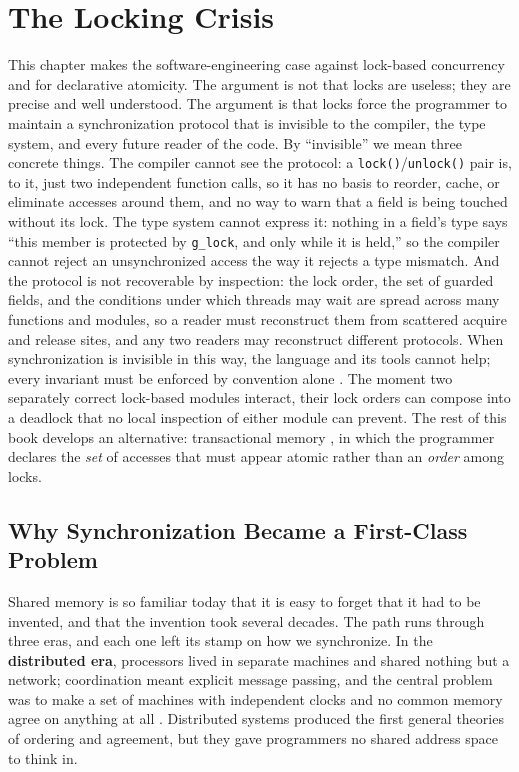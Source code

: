 \chapter{The Locking Crisis}\label{ch:locking-crisis}

This chapter makes the software-engineering case against lock-based concurrency
and for declarative atomicity. The argument is not that locks are useless;
they are precise and well understood. The argument is that locks force the
programmer to maintain a synchronization protocol that is invisible to the
compiler, the type system, and every future reader of the code. By
``invisible'' we mean three concrete things. The compiler cannot see the
protocol: a \texttt{lock()}/\texttt{unlock()} pair is, to it, just two
independent function calls, so it has no basis to reorder, cache, or eliminate
accesses around them, and no way to warn that a field is being touched without
its lock. The type system cannot express it: nothing in a field's type says
``this member is protected by \texttt{g\_lock}, and only while it is held,''
so the compiler cannot reject an unsynchronized access the way it rejects a
type mismatch. And the protocol is not recoverable by inspection: the lock
order, the set of guarded fields, and the conditions under which threads may
wait are spread across many functions and modules, so a reader must reconstruct
them from scattered acquire and release sites, and any two readers may
reconstruct different protocols. When synchronization is invisible in this
way, the language and its tools cannot help; every invariant must be enforced
by convention alone \cite{boehm05}. The moment two separately correct lock-based
modules interact, their lock orders can compose into a deadlock that no local
inspection of either module can prevent. The rest of this book develops an
alternative: transactional memory \cite{herlihy93}, in which the programmer
declares the \emph{set} of accesses that must appear atomic rather than an
\emph{order} among locks.

\section{Why Synchronization Became a First-Class Problem}

Shared memory is so familiar today that it is easy to forget that it had to be
invented, and that the invention took several decades. The path runs through
three eras, and each one left its stamp on how we synchronize. In the
\textbf{distributed era}, processors lived in separate machines and shared
nothing but a network; coordination meant explicit message passing, and the
central problem was to make a set of machines with independent clocks and no
common memory agree on anything at all \cite{lamport78}. Distributed systems
produced the first general theories of ordering and agreement, but they gave
programmers no shared address space to think in.

